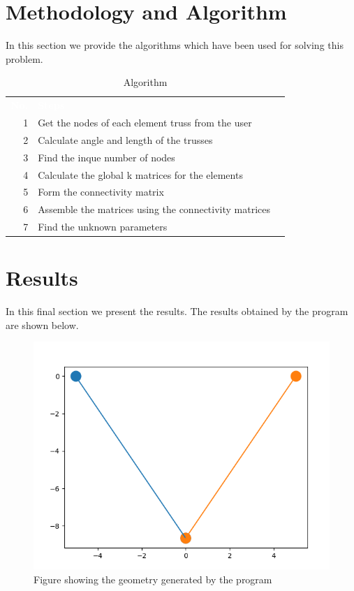 \documentclass{article}
\newcommand{\head}[1]{%
\textcolor{white}{\textbf{#1}}}
\begin{document}
\section{Methodology and Algorithm}
In this section we provide the algorithms which have been used for solving this problem. 
\begin{table}[ht]
   \centering
   \sffamily
   \begin{tabular}{rlr}
     \rowcolor{black!75}
      \head{No.}& \head{Steps}  \\
     1 & Get the nodes of each element truss from the user        \\
     2 & Calculate angle and length of the trusses \\
     3 & Find the inque number of nodes\\
     4 & Calculate the global k matrices for the elements \\
     5 & Form the connectivity matrix \\
     6 & Assemble the matrices using the connectivity matrices      \\
     7 & Find the unknown parameters  \\
  \end{tabular}
  \caption{Algorithm}
\end{table}


\section{Results}
In this final section we present the results. The results obtained by the program are shown below.
\begin{figure}[h!]
\centering
\includegraphics[scale=.6]{10.png}
\caption{Figure showing the geometry generated by the program}
\label{fig:fig1}
\end{figure}
\end{document}
